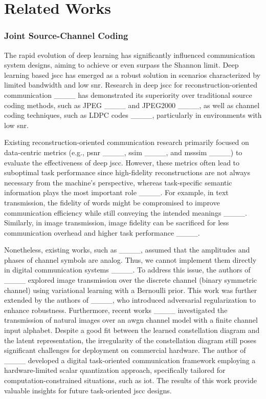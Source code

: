 \section{Related Works}
\subsubsection{Joint Source-Channel Coding}
The rapid evolution of deep learning has significantly influenced communication system designs, aiming to achieve or even surpass the Shannon limit. Deep learning based \gls{jscc} has emerged as a robust solution in scenarios characterized by limited bandwidth and low \gls{snr}. Research in deep \gls{jscc} for reconstruction-oriented communication ____ has demonstrated its superiority over traditional source coding methods, such as JPEG ____ and JPEG2000 ____, as well as channel coding techniques, such as LDPC codes ____, particularly in environments with low \gls{snr}.

Existing reconstruction-oriented communication research primarily focused on data-centric metrics (e.g., \gls{psnr} ____, \gls{ssim} ____, and \gls{msssim} ____) to evaluate the effectiveness of deep \gls{jscc}. However, these metrics often lead to suboptimal task performance since high-fidelity reconstructions are not always necessary from the machine's perspective, whereas task-specific semantic information plays the most important role ____. For example, in text transmission, the fidelity of words might be compromised to improve communication efficiency while still conveying the intended meanings ____. Similarly, in image transmission, image fidelity can be sacrificed for less communication overhead and higher task performance ____. 

Nonetheless, existing works, such as ____, assumed that the amplitudes and phases of channel symbols are analog. Thus, we cannot implement them directly in digital communication systems ____. To address this issue, the authors of ____ explored image transmission over the discrete channel (binary symmetric channel) using variational learning with a Bernoulli prior. This work was further extended by the authors of ____, who introduced adversarial regularization to enhance robustness. Furthermore, recent works ____ investigated the transmission of natural images over an \gls{awgn} channel model with a finite channel input alphabet. Despite a good fit between the learned constellation diagram and the latent representation, the irregularity of the constellation diagram still poses significant challenges for deployment on commercial hardware. The author of ____ developed a digital task-oriented communication framework employing a hardware-limited scalar quantization approach, specifically tailored for computation-constrained situations, such as \gls{iot}. The results of this work provide valuable insights for future task-oriented \gls{jscc} designs.


